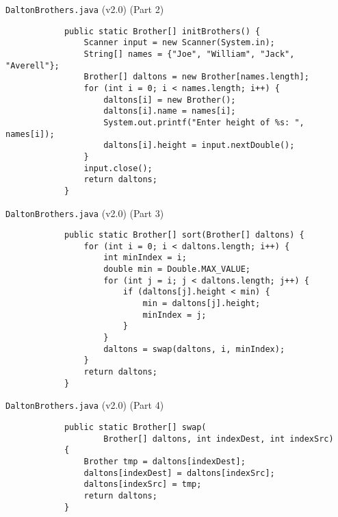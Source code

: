 \documentclass[10pt, compress]{beamer}
\begin{document}
\begin{slide}
	\begin{block}{\texttt{DaltonBrothers.java} (v2.0) (Part 2)}
		\begin{verbatim}
			public static Brother[] initBrothers() {
			    Scanner input = new Scanner(System.in);
			    String[] names = {"Joe", "William", "Jack", "Averell"};
			    Brother[] daltons = new Brother[names.length];
			    for (int i = 0; i < names.length; i++) {
			        daltons[i] = new Brother();
			        daltons[i].name = names[i];
			        System.out.printf("Enter height of %s: ", names[i]);
			        daltons[i].height = input.nextDouble();
			    }
			    input.close();
			    return daltons;
			}
		\end{verbatim}
	\end{block}
\end{slide}

\begin{slide}
	\begin{block}{\texttt{DaltonBrothers.java} (v2.0) (Part 3)}
		\begin{verbatim}
			public static Brother[] sort(Brother[] daltons) {
			    for (int i = 0; i < daltons.length; i++) {
			        int minIndex = i;
			        double min = Double.MAX_VALUE;
			        for (int j = i; j < daltons.length; j++) {
			            if (daltons[j].height < min) {
			                min = daltons[j].height;
			                minIndex = j;
			            }
			        }
			        daltons = swap(daltons, i, minIndex);
			    }
			    return daltons;
			}
		\end{verbatim}
	\end{block}
\end{slide}

\begin{slide}
	\begin{block}{\texttt{DaltonBrothers.java} (v2.0) (Part 4)}
		\begin{verbatim}
			public static Brother[] swap(
			        Brother[] daltons, int indexDest, int indexSrc)
			{
			    Brother tmp = daltons[indexDest];
			    daltons[indexDest] = daltons[indexSrc];
			    daltons[indexSrc] = tmp;
			    return daltons;
			}
		\end{verbatim}
	\end{block}
\end{slide}
\end{document}
